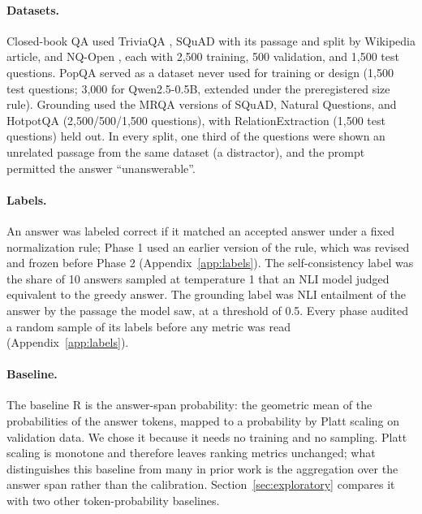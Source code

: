 \documentclass[10pt]{article}
\begin{document}
\paragraph{Datasets.} Closed-book QA used TriviaQA \citep{joshi-etal-2017-triviaqa}, SQuAD \citep{rajpurkar-etal-2016-squad} with its passage and split by Wikipedia article, and NQ-Open \citep{kwiatkowski-etal-2019-natural}, each with 2,500 training, 500 validation, and 1,500 test questions. PopQA \citep{mallen-etal-2023-trust} served as a dataset never used for training or design (1,500 test questions; 3,000 for Qwen2.5-0.5B, extended under the preregistered size rule). Grounding used the MRQA \citep{fisch-etal-2019-mrqa} versions of SQuAD, Natural Questions, and HotpotQA \citep{yang-etal-2018-hotpotqa} (2,500/500/1,500 questions), with RelationExtraction (1,500 test questions) held out. In every split, one third of the questions were shown an unrelated passage from the same dataset (a distractor), and the prompt permitted the answer ``unanswerable''.

\paragraph{Labels.} An answer was labeled correct if it matched an accepted answer under a fixed normalization rule; Phase 1 used an earlier version of the rule, which was revised and frozen before Phase 2 (Appendix~\ref{app:labels}). The self-consistency label was the share of 10 answers sampled at temperature 1 that an NLI model \citep{he2021deberta} judged equivalent to the greedy answer. The grounding label was NLI entailment of the answer by the passage the model saw, at a threshold of 0.5. Every phase audited a random sample of its labels before any metric was read (Appendix~\ref{app:labels}).

\paragraph{Baseline.} The baseline R is the answer-span probability: the geometric mean of the probabilities of the answer tokens, mapped to a probability by Platt scaling \citep{platt1999probabilistic} on validation data. We chose it because it needs no training and no sampling. Platt scaling is monotone and therefore leaves ranking metrics unchanged; what distinguishes this baseline from many in prior work is the aggregation over the answer span rather than the calibration. Section~\ref{sec:exploratory} compares it with two other token-probability baselines.
\end{document}
